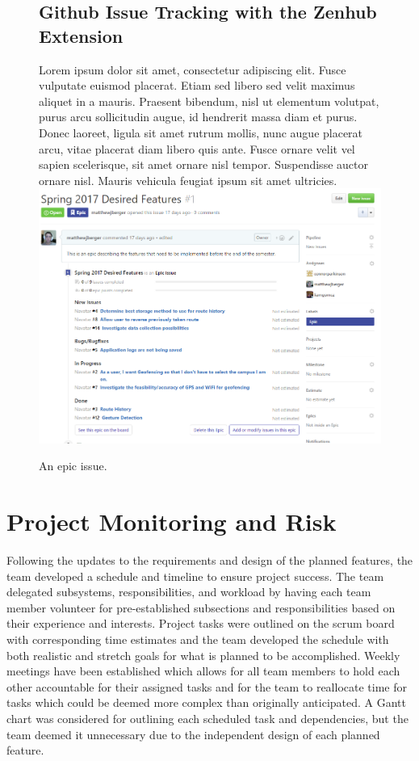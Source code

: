 \documentclass{scrreprt}
\begin{document}
\begin{center}
\pagebreak
\begin{figure}[ht!]
\section{Github Issue Tracking with the Zenhub Extension}
Lorem ipsum dolor sit amet, consectetur adipiscing elit. Fusce vulputate euismod placerat. Etiam sed libero sed velit maximus aliquet in a mauris. Praesent bibendum, nisl ut elementum volutpat, purus arcu sollicitudin augue, id hendrerit massa diam et purus. Donec laoreet, ligula sit amet rutrum mollis, nunc augue placerat arcu, vitae placerat diam libero quis ante. Fusce ornare velit vel sapien scelerisque, sit amet ornare nisl tempor. Suspendisse auctor ornare nisl. Mauris vehicula feugiat ipsum sit amet ultricies.
\includegraphics[width=\textwidth,height=\textheight,keepaspectratio]{epic.png}
\caption{An epic issue.}
\end{figure}
\end{center}

\pagebreak

\chapter{Project Monitoring and Risk}

Following the updates to the requirements and design of the planned features, the team developed a schedule and timeline to ensure project success. The team delegated subsystems, responsibilities, and workload by having each team member volunteer for pre-established subsections and responsibilities based on their experience and interests. Project tasks were outlined on the scrum board with corresponding time estimates and the team developed the schedule with both realistic and stretch goals for what is planned to be accomplished. Weekly meetings have been established which allows for all team members to hold each other accountable for their assigned tasks and for the team to reallocate time for tasks which could be deemed more complex than originally anticipated. A Gantt chart was considered for outlining each scheduled task and dependencies, but the team deemed it unnecessary due to the independent design of each planned feature.
\end{document}
